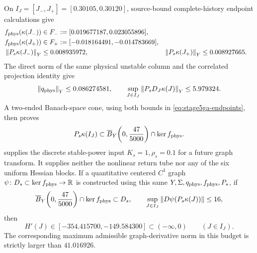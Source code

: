 \begin{theorem}
\label{thm:conditional-stable-gap-slope}
On \(I_J=[J_-,J_+]=[0.30105,0.30120]\), source-bound complete-history
endpoint calculations give
\begin{equation}
 \begin{aligned}
 f_{\rm phys}(\kappa(J_-))&\in
   F_-:=[0.019677187,0.023055896],\\
 f_{\rm phys}(\kappa(J_+))&\in
   F_+:=[-0.018164491,-0.014783669],\\
 \left\lVert P_s\kappa(J_-)\right\rVert_Y&\le0.008935972,
 &\left\lVert P_s\kappa(J_+)\right\rVert_Y&\le0.008927665.
 \end{aligned}                                        \label{eq:stage5ga-endpoints}
\end{equation}
The direct norm of the same physical unstable column and the correlated
projection identity give
\begin{equation}
 \left\lVert q_{\rm phys}\right\rVert_Y\le0.086274581,
 \qquad
 \sup_{J\in I_J}\left\lVert P_sD_J\kappa(J)\right\rVert_Y\le5.979324. \label{eq:stage5gb-projection}
\end{equation}
A two-ended Banach-space cone, using both bounds in
\cref{eq:stage5ga-endpoints}, then proves
\begin{equation}
 P_s\kappa(I_J)
 \subset \overline B_Y\!\left(0,\frac{47}{5000}\right)
             \cap\ker f_{\rm phys}.                   \label{eq:stage5gb-cone}
\end{equation}
 supplies the discrete stable-power input
\(K_s=1,\rho_s=0.1\) for a future graph transform.  It supplies neither the
nonlinear return tube nor any of the six uniform Hessian blocks.
If a quantitative centered \(C^1\) graph
\(\psi\colon D_s\subset\ker f_{\rm phys}\to\mathbb R\) is
constructed using this same \(Y,\Sigma,q_{\rm phys},f_{\rm phys},P_s\), if
\begin{equation}
 \overline B_Y\!\left(0,\frac{47}{5000}\right)
      \cap\ker f_{\rm phys}\subset D_s,
 \qquad
 \sup_{J\in I_J}\left\lVert D\psi(P_s\kappa(J))\right\rVert\le16,     \label{eq:stage5gb-gate}
\end{equation}
then
\begin{equation}
 H'(J)\in[-354.415700,-149.584300]\subset(-\infty,0)
 \qquad(J\in I_J).                                    \label{eq:stage5gb-slope}
\end{equation}
The corresponding maximum admissible graph-derivative norm in this budget is
strictly larger than \(41.016926\).
\end{theorem}

